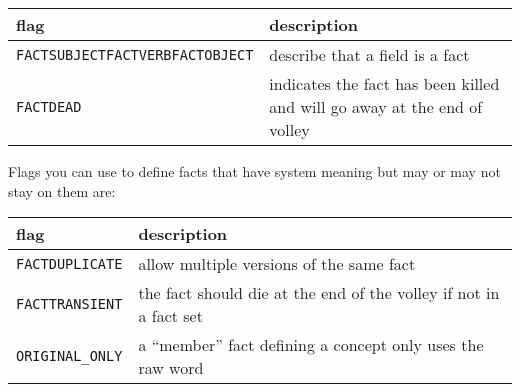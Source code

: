 \documentclass[]{article}
\begin{document}
\begin{longtable}[]{@{}ll@{}}
\toprule
\begin{minipage}[b]{0.21\columnwidth}\raggedright\strut
flag\strut
\end{minipage} & \begin{minipage}[b]{0.44\columnwidth}\raggedright\strut
description\strut
\end{minipage}\tabularnewline
\midrule
\endhead
\begin{minipage}[t]{0.21\columnwidth}\raggedright\strut
\texttt{FACTSUBJECT}\texttt{FACTVERB}\texttt{FACTOBJECT}\strut
\end{minipage} & \begin{minipage}[t]{0.44\columnwidth}\raggedright\strut
describe that a field is a fact\strut
\end{minipage}\tabularnewline
\begin{minipage}[t]{0.21\columnwidth}\raggedright\strut
\texttt{FACTDEAD}\strut
\end{minipage} & \begin{minipage}[t]{0.44\columnwidth}\raggedright\strut
indicates the fact has been killed and will go away at the end of
volley\strut
\end{minipage}\tabularnewline
\bottomrule
\end{longtable}

Flags you can use to define facts that have system meaning but may or
may not stay on them are:

\begin{longtable}[]{@{}ll@{}}
\toprule
\begin{minipage}[b]{0.21\columnwidth}\raggedright\strut
flag\strut
\end{minipage} & \begin{minipage}[b]{0.44\columnwidth}\raggedright\strut
description\strut
\end{minipage}\tabularnewline
\midrule
\endhead
\begin{minipage}[t]{0.21\columnwidth}\raggedright\strut
\texttt{FACTDUPLICATE}\strut
\end{minipage} & \begin{minipage}[t]{0.44\columnwidth}\raggedright\strut
allow multiple versions of the same fact\strut
\end{minipage}\tabularnewline
\begin{minipage}[t]{0.21\columnwidth}\raggedright\strut
\texttt{FACTTRANSIENT}\strut
\end{minipage} & \begin{minipage}[t]{0.44\columnwidth}\raggedright\strut
the fact should die at the end of the volley if not in a fact set\strut
\end{minipage}\tabularnewline
\begin{minipage}[t]{0.21\columnwidth}\raggedright\strut
\texttt{ORIGINAL\_ONLY}\strut
\end{minipage} & \begin{minipage}[t]{0.44\columnwidth}\raggedright\strut
a ``member'' fact defining a concept only uses the raw word\strut
\end{minipage}\tabularnewline
\bottomrule
\end{longtable}
\end{document}
